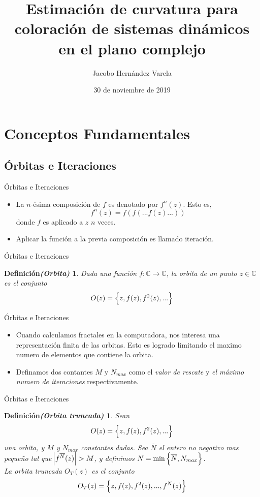 \documentclass[11pt]{beamer}
\title{Estimación de curvatura para coloración de sistemas dinámicos en el plano complejo}
\author{Jacobo Hernández Varela}
\date{30 de noviembre de 2019}
\newtheorem{defi1}{{Definición}{\it (Orbita)}}[section]
\newtheorem{defi2}{{Definición}{\it (Orbita truncada)}}[section]
\begin{document}
\maketitle

\section{Conceptos Fundamentales}

\subsection{Órbitas e Iteraciones}
\begin{frame}{Órbitas e Iteraciones}
	\begin{itemize}
		\item La $n$-ésima composición de $f$ es denotado por $f^n(z)$. Esto es,
	\[ f^n(z) = f(f(...f(z)...)) \]
	donde $f$ es aplicado a $z$ $n$ veces.
	
		\item Aplicar la función a la previa composición es llamado iteración.
	\end{itemize}
\end{frame}

\begin{frame}{Órbitas e Iteraciones}
	\begin{defi1}
		Dada una función $f:\mathds{C}\to\mathds{C}$, la orbita de un punto $z\in\mathds{C}$ es el conjunto
		\[ O(z) = \set{z, f(z), f^2(z), ...} \]
	\end{defi1}
\end{frame}

\begin{frame}{Órbitas e Iteraciones}
	\begin{itemize}
		\item Cuando calculamos fractales en la computadora, nos interesa una representación finita de las orbitas. Esto es logrado limitando el maximo numero de elementos que contiene la orbita.
		
		\item Definamos dos contantes $M$ y $N_{max}$ como el \textit{valor de rescate} y \textit{el máximo numero de iteraciones} respectivamente.
	\end{itemize}
\end{frame}

\begin{frame}{Órbitas e Iteraciones}
	\begin{defi2}
		Sean
		\[ O(z) = \set{z, f(z), f^2(z),...} \]
		una orbita, y $M$ y $N_{max}$ constantes dadas. Sea $\overline{N}$ el entero no negativo mas pequeño tal que $\abs{f^{\overline{N}}(z)} > M$, y definimos $N = \min\set{\overline{N}, N_{max}}$.\\
		La orbita truncada $O_T(z)$ es el conjunto 
		\[ O_T(z) = \set{z, f(z), f^2(z),...,f^N(z)} \]
	\end{defi2}
\end{frame}
\end{document}
